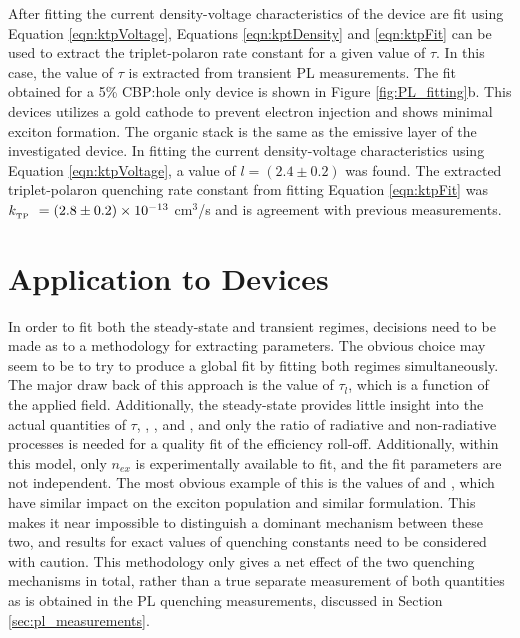 \documentclass[../thesis.tex]{subfiles}
\begin{document}
After fitting the current density-voltage characteristics of the device are fit using Equation \ref{eqn:ktpVoltage}, Equations \ref{eqn:kptDensity} and \ref{eqn:ktpFit} can be used to extract the triplet-polaron rate constant for a given value of $\tau$.  
In this case, the value of $\tau$ is extracted from transient PL measurements.
The fit obtained for a 5\% CBP:\irppy hole only device is shown in Figure \ref{fig:PL_fitting}b.
This devices utilizes a gold cathode to prevent electron injection and shows minimal exciton formation.
The organic stack is the same as the emissive layer of the investigated device.  
In fitting the current density-voltage characteristics using Equation \ref{eqn:ktpVoltage}, a value of $l=(2.4\pm0.2)$ was found.  
The extracted triplet-polaron quenching rate constant from fitting Equation \ref{eqn:ktpFit} was $k_{_\text{\tiny TP}}\ =(2.8\pm0.2)\times 10^{-13}$ cm$^3$/s and is agreement with previous measurements.\supercite{Erickson2014,Reineke2007}


\section{Application to Devices}

In order to fit both the steady-state and transient regimes, decisions need to be made as to a methodology for extracting parameters.  
The obvious choice may seem to be to try to produce a global fit by fitting both regimes simultaneously.  
The major draw back of this approach is the value of $\tau_l$, which is a function of the applied field.
Additionally, the steady-state provides little insight into the actual quantities of $\tau$, \ktt, \ktp, and \kf, and only the ratio of radiative and non-radiative processes is needed for a quality fit of the efficiency roll-off.
Additionally, within this model, only $n_{ex}$ is experimentally available to fit, and the fit parameters are not independent.
The most obvious example of this is the values of \ktt and \ktp, which have similar impact on the exciton population and similar formulation.  
This makes it near impossible to distinguish a dominant mechanism between these two, and results for exact values of quenching constants need to be considered with caution.
This methodology only gives a net effect of the two quenching mechanisms in total, rather than a true separate measurement of both quantities as is obtained in the PL quenching measurements, discussed in Section \ref{sec:pl_measurements}.
\end{document}

